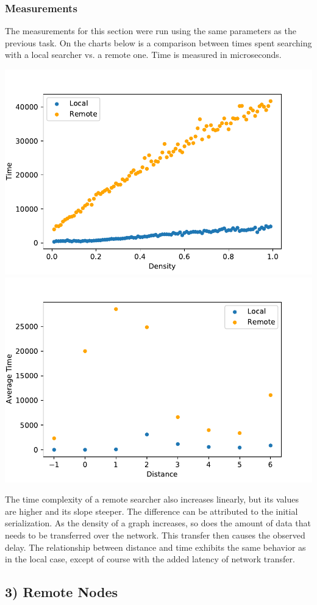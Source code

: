 \documentclass{scrartcl}
\begin{document}
    \subsubsection*{Measurements}
    The measurements for this section were run using the same parameters as the previous task. On the charts below is a comparison between times spent searching with a local searcher vs. a remote one. Time is measured in microseconds.
    \begin{center}
        \includegraphics[width=0.8\linewidth]{picture2.pdf}
        \includegraphics[width=0.8\linewidth]{picture_dist2.pdf}
    \end{center}
    The time complexity of a remote searcher also increases linearly, but its values are higher and its slope steeper. The difference can be attributed to the initial serialization. As the density of a graph increases, so does the amount of data that needs to be transferred over the network. This transfer then causes the observed delay. The relationship between distance and time exhibits the same behavior as in the local case, except of course with the added latency of network transfer.
    \subsection*{3) Remote Nodes}
\end{document}

